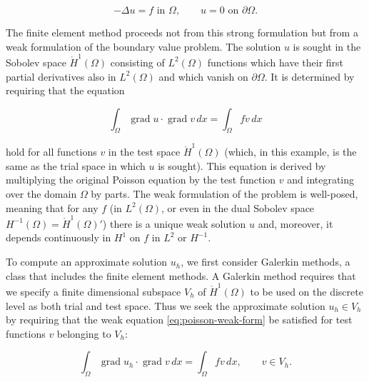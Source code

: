 \[
-\Delta u=f\text{{ in }}\Omega,\qquad u=0\text{{ on }}\partial\Omega.
\]

{The finite element method proceeds not from this strong formulation but from a weak formulation of the boundary value problem. The solution $u$ is sought in the Sobolev space $\mathring H^1(\Omega)$ consisting of $L^2(\Omega)$ functions which have their first partial derivatives also in $L^2(\Omega)$ and which vanish on $\partial\Omega$. It is determined by requiring that the equation}

\begin{equation}\label{eq:poisson-weak-form}
\int_\Omega\operatorname{grad}u\cdot\operatorname{grad}v\,dx=\int_\Omega fv\,dx
\end{equation}

{hold for all functions $v$ in the test space $\mathring H^1(\Omega)$ (which, in this example, is the same as the trial space in which $u$ is sought). This equation is derived by multiplying the original Poisson equation by the test function $v$ and integrating over the domain $\Omega$ by parts. The weak formulation of the problem is well-posed, meaning that for any $f$ (in $L^2(\Omega)$, or even in the dual Sobolev space $H^{-1}(\Omega)=\mathring H^1(\Omega)'$) there is a unique weak solution $u$ and, moreover, it depends continuously in $H^1$ on $f$ in $L^2$ or $H^{-1}$.}

{To compute an approximate solution $u_h$, we first consider Galerkin methods, a class that includes the finite element methods. A Galerkin method requires that we specify a finite dimensional subspace $V_h$ of $\mathring H^1(\Omega)$ to be used on the discrete level as both trial and test space. Thus we seek the approximate solution $u_h\in V_h$ by requiring that the weak equation \eqref{eq:poisson-weak-form} be satisfied for test functions $v$ belonging to $V_h$:}

\begin{equation}\label{eq:poisson-galerkin-form}
\int_\Omega\operatorname{grad}u_h\cdot\operatorname{grad}v\,dx=\int_\Omega fv\,dx,\qquad v\in V_h.
\end{equation}

